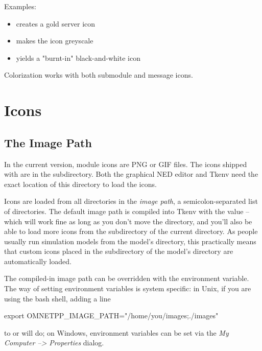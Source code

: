 Examples:

\begin{itemize}
  \item {} creates a gold server icon
  \item {} makes the icon greyscale
  \item {} yields a "burnt-in" black-and-white icon
\end{itemize}

Colorization works with both submodule and message icons.


\section{Icons}
\label{sec:ch-graphics:icon-library}

\subsection{The Image Path}

In the current {\opp} version, module icons are PNG or GIF files. The icons shipped
with {\opp} are in the  subdirectory. Both the graphical NED editor
and Tkenv need the exact location of this directory to load the icons.

Icons are loaded from all directories in the \textit{image path},
a semicolon-separated list of directories.
The default image path is compiled into Tkenv with the value
 -- which will work fine
as long as you don't move the directory, and you'll also be able to
load more icons from the  subdirectory of the current
directory. As people usually run simulation models from the model's
directory, this practically means that custom icons placed in the
 subdirectory of the model's directory are automatically
loaded.

The compiled-in image path can be overridden with the 
environment variable. The way of setting environment variables is system
specific: in Unix, if you are using the bash shell, adding a line

\begin{commandline}
export OMNETPP_IMAGE_PATH="/home/you/images;./images"
\end{commandline}

to  or  will do; on Windows, environment variables
can be set via the \textit{My Computer --> Properties} dialog.

